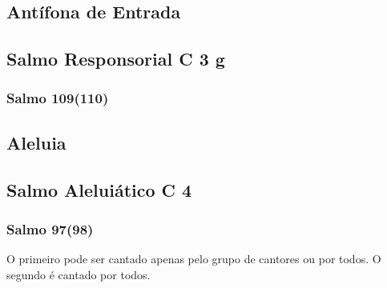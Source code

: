 \subsection{Antífona de Entrada}\label{subsection:tempus-nativitatis/in-nativitatis-domini/introitus}


\subsection[Salmo Responsorial]{Salmo Responsorial \textmd{C 3 g}}\label{subsection:tempus-nativitatis/in-nativitatis-domini/psalmus-responsorius}
\subsubsection{Salmo 109(110)}

\AllowPageFlush

\subsection{Aleluia}\label{subsection:tempus-nativitatis/in-nativitatis-domini/alleluia}

\AllowPageFlush

\subsection[Salmo Aleluiático]{Salmo Aleluiático \textmd{C 4}}\label{subsection:tempus-nativitatis/in-nativitatis-domini/psalmus-alleluiaticus}
\subsubsection{Salmo 97(98)}
\begin{rubrica}
  O primeiro {\normalfont\Rbar} pode ser cantado apenas pelo grupo de cantores ou por todos. O segundo {\normalfont\Rbar} é cantado por todos.
\end{rubrica}

\AllowPageFlush

